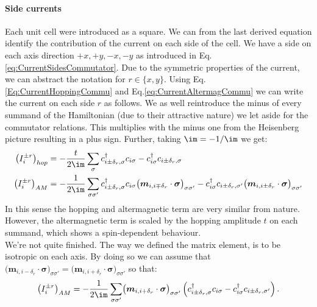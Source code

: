 \documentclass[../main.tex]{subfile}
\begin{document}
\paragraph{Side currents} $~$\\
Each unit cell were introduced as a square. We can from the last derived equation identify the contribution of the current on each side of the cell. We have a side on 
each axis direction $+x, +y, -x, -y$ as introduced in Eq.\ref{eq:CurrentSidesCommutator}. Due to the symmetric properties of the current, we can abstract the notation
for $r\in\{x,y\}$. Using Eq.\ref{Eq:CurrentHoppingCommu} and Eq.\ref{eq:CurrentAltermagCommu} we can write the current on each side $r$ as follows.
We as well reintroduce the minus of every summand of the Hamiltonian (due to their attractive nature) we let aside for the commutator relations. This multiplies 
with the minus one from the Heisenberg picture resulting in a plus sign. Further, taking $\im = -1/\im$ we get:
\begin{align}
    \left(I_{i}^{\pm r}\right)_{hop} &= -\frac{t}{2\im}\sum_{\sigma}c_{i\pm\delta_r,\sigma}^{\dagger}c_{i\sigma} -c_{i\sigma}^{\dagger}c_{i\pm\delta_r,\sigma}  \\
    \left(I_{i}^{\pm r}\right)_{AM} &=  -\frac{1}{2\im}\sum_{\sigma\sigma'}c_{i\pm\delta_r,\sigma}^{\dagger}c_{i\sigma}\bigl(\bm{m}_{i,i\mp\delta_r}\cdot\bm{\sigma}\bigr)_{\sigma\sigma'} - c_{i\sigma}^{\dagger}c_{i\pm\delta_r,\sigma'}\bigl(\bm{m}_{i,i\pm\delta_r}\cdot\bm{\sigma}\bigr)_{\sigma\sigma'} 
\end{align}
In this sense the hopping and altermagnetic term are very similar from nature. However, the altermagnetic term is scaled by the hopping amplitude $t$ on each summand, 
which shows a spin-dependent behaviour.\\

We're not quite finished. The way we defined the matrix element, is to be isotropic on each axis. By doing so we can 
assume that $\bigl(\bm{m}_{i,i-\delta_r}\cdot\bm{\sigma}\bigr)_{\sigma\sigma'} = \bigl(\bm{m}_{i,i+\delta_r}\cdot\bm{\sigma}\bigr)_{\sigma\sigma'}$ so that:
\begin{equation}
    \left(I_{i}^{\pm r}\right)_{AM} =  -\frac{1}{2\im}\sum_{\sigma\sigma'}\bigl(\bm{m}_{i,i+\delta_r}\cdot\bm{\sigma}\bigr)_{\sigma\sigma'}\left(c_{i\pm\delta_r,\sigma}^{\dagger}c_{i\sigma} - c_{i\sigma}^{\dagger}c_{i\pm\delta_r,\sigma'}\right).
\end{equation}
\end{document}
